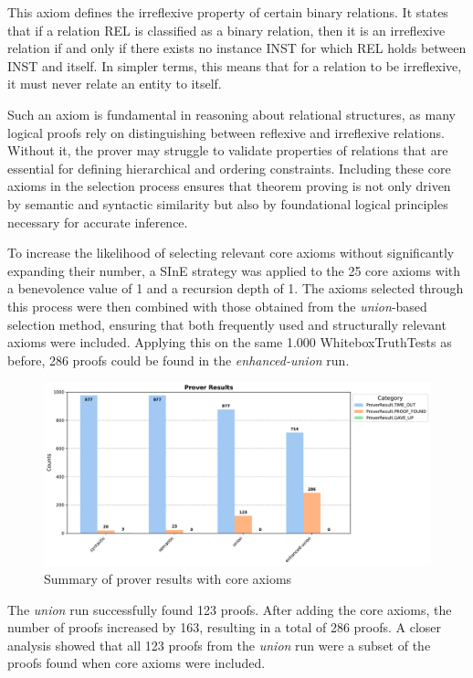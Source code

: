 \documentclass[english,version-2020-11]{uzl-thesis}
\begin{document}
This axiom defines the irreflexive property of certain binary relations. It states that if a relation REL is classified as a binary relation, then it is an irreflexive relation if and only if there exists no instance INST for which REL holds between INST and itself. In simpler terms, this means that for a relation to be irreflexive, it must never relate an entity to itself.

Such an axiom is fundamental in reasoning about relational structures, as many logical proofs rely on distinguishing between reflexive and irreflexive relations. Without it, the prover may struggle to validate properties of relations that are essential for defining hierarchical and ordering constraints. Including these core axioms in the selection process ensures that theorem proving is not only driven by semantic and syntactic similarity but also by foundational logical principles necessary for accurate inference.

To increase the likelihood of selecting relevant core axioms without significantly expanding their number, a SInE strategy was applied to the 25 core axioms with a benevolence value of 1 and a recursion depth of 1. The axioms selected through this process were then combined with those obtained from the \textit{union}-based selection method, ensuring that both frequently used and structurally relevant axioms were included. Applying this on the same 1.000 WhiteboxTruthTests as before, 286 proofs could be found in the \textit{enhanced-union} run.

\begin{figure}[h!]
    \centering
    \includegraphics[width=\textwidth]{standard_mode_output.pdf}
    \caption{Summary of prover results with core axioms}
    \label{fig:prover_results_with_core_axioms}
\end{figure}
\FloatBarrier

The \textit{union} run successfully found 123 proofs. After adding the core axioms, the number of proofs increased by 163, resulting in a total of 286 proofs. A closer analysis showed that all 123 proofs from the \textit{union} run were a subset of the proofs found when core axioms were included. 
\end{document}
